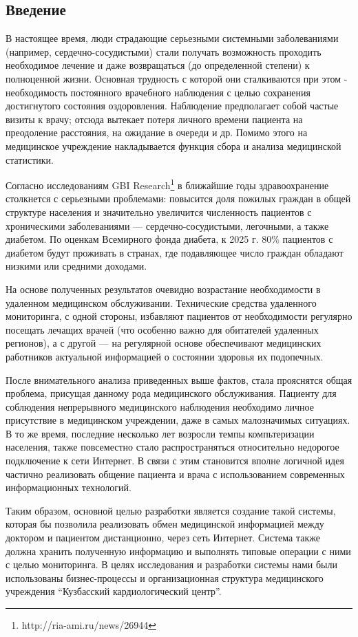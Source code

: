 \newpage 
\subsection*{Введение}
В настоящее время, люди страдающие серьезными системными заболеваниями
(например, сердечно-сосудистыми) стали получать возможность проходить необходимое лечение и даже возвращаться (до
определенной степени) к полноценной жизни. Основная трудность с которой они
сталкиваются при этом - необходимость постоянного врачебного наблюдения с целью
сохранения достигнутого состояния оздоровления. Наблюдение предполагает собой
частые визиты к врачу; отсюда вытекает потеря личного времени пациента на
преодоление расстояния, на ожидание в очереди и др. Помимо этого на медицинское
учреждение накладывается функция сбора и анализа медицинской статистики.

Согласно исследованиям GBI Research\footnote{ http://ria-ami.ru/news/26944 } в
ближайшие годы здравоохранение столкнется с серьезными проблемами: повысится
доля пожилых граждан в общей структуре населения и значительно увеличится
численность пациентов с хроническими заболеваниями — сердечно-сосудистыми,
легочными, а также диабетом. По оценкам Всемирного фонда диабета, к 2025 г. 80\%
пациентов с диабетом будут проживать в странах, где подавляющее число граждан
обладают низкими или средними доходами.

На основе полученных результатов очевидно возрастание необходимости в удаленном
медицинском обслуживании. Технические средства удаленного мониторинга, с одной
стороны, избавляют пациентов от необходимости регулярно посещать лечащих врачей
(что особенно важно для обитателей удаленных регионов), а с другой — на
регулярной основе обеспечивают медицинских работников актуальной информацией о
состоянии здоровья их подопечных.

После внимательного анализа приведенных выше фактов, стала прояснятся общая
проблема, присущая данному рода медицинского обслуживания. Пациенту для
соблюдения непрерывного медицинского наблюдения необходимо личное присутствие в
медицинском учреждении, даже в самых малозначимых ситуациях.
В то же время, последние  несколько лет возросли темпы компьтеризации населения,
также повсеместно стало  распространяться относительно недорогое подключение к
сети Интернет. В связи с этим становится вполне логичной идея частично
реализовать общение пациента и врача с использованием современных информационных
технологий.

Таким образом, основной целью разработки  является создание такой системы,
которая бы позволила реализовать обмен медицинской информацией между доктором и
пациентом дистанционно, через сеть Интернет. Система также должна хранить
полученную информацию и выполнять типовые операции с ними с целью мониторинга.
В целях исследования и разработки системы нами были использованы бизнес-процессы
и организационная структура медицинского учреждения “Кузбасский кардиологический
центр”.